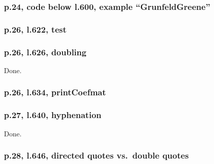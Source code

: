 \documentclass[12pt,english]{scrartcl}
\begin{document}
\subsubsection{p.24, code below l.600, example ``GrunfeldGreene''}

\subsubsection{p.26, l.622, test}

\subsubsection{p.26, l.626, doubling}

Done.

\subsubsection{p.26, l.634, printCoefmat}

\subsubsection{p.27, l.640, hyphenation}

Done.

\subsubsection{p.28, l.646, directed quotes vs.\ double quotes}
\end{document}
